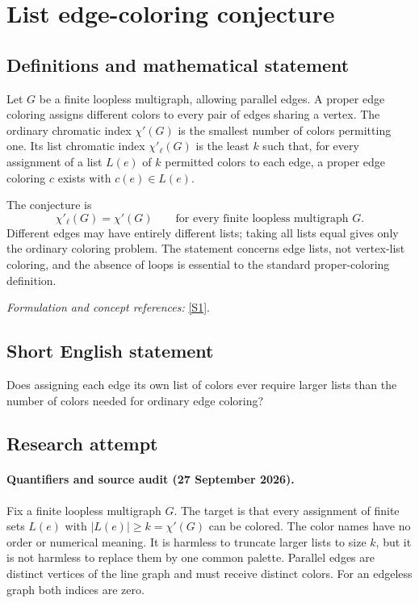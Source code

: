 \documentclass[11pt]{article}
\begin{document}
\section*{\texorpdfstring{List edge-coloring conjecture}{List edge-coloring conjecture}}\label{496}
\subsection{Definitions and mathematical statement}
Let $G$ be a finite loopless multigraph, allowing parallel edges. A proper edge coloring assigns different colors to every pair of edges sharing a vertex. The ordinary chromatic index $\chi'(G)$ is the smallest number of colors permitting one. Its list chromatic index $\chi'_\ell(G)$ is the least $k$ such that, for every assignment of a list $L(e)$ of $k$ permitted colors to each edge, a proper edge coloring $c$ exists with $c(e)\in L(e)$.

The conjecture is
\[
 \chi'_\ell(G)=\chi'(G)\qquad\text{for every finite loopless multigraph }G.
\]
Different edges may have entirely different lists; taking all lists equal gives only the ordinary coloring problem. The statement concerns edge lists, not vertex-list coloring, and the absence of loops is essential to the standard proper-coloring definition.
\par\smallskip\textit{Formulation and concept references:} \href{https://www.sciencedirect.com/science/article/pii/S0012365X25000287}{[S1]}.

\subsection{Short English statement}
Does assigning each edge its own list of colors ever require larger lists than the number of colors needed for ordinary edge coloring?
\subsection{Research attempt}

\paragraph{Quantifiers and source audit (27 September 2026).}
Fix a finite loopless multigraph $G$. The target is that every assignment of
finite sets $L(e)$ with $|L(e)|\geq k=\chi'(G)$ can be colored. The color
names have no order or numerical meaning. It is harmless to truncate larger
lists to size $k$, but it is not harmless to replace them by one common
palette. Parallel edges are distinct vertices of the line graph and must
receive distinct colors. For an edgeless graph both indices are zero.
\end{document}
